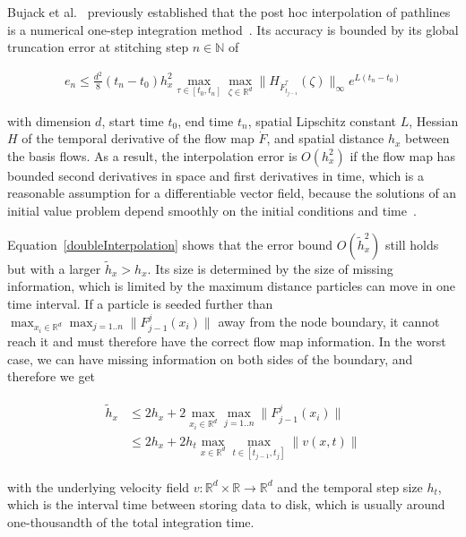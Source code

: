 %
Bujack et al.~\cite{bujack2015lagrangian} previously established that the post hoc interpolation 
of pathlines is a numerical one-step integration method~\cite{GH10}. 
%
Its accuracy is bounded by its global truncation error at stitching step $n\in\mathbb N$ of 
%
\begin{footnotesize}
\begin{equation}
\begin{aligned}\label{global}
e_{n}\leq\frac {d^2}8(t_n-t_0) h_x^2\max_{\tau\in[t_0,t_n]}\max_{\zeta\in\mathbb R^d}
\| H_{{\dot F}_{t_{j-1}}^{\tau}}(\zeta)\|_{\infty}e^{L(t_n-t_0)}
\end{aligned}
\end{equation}
\end{footnotesize}
%
with dimension $d$, start time $t_0$, end time $t_n$, spatial Lipschitz constant $L$, Hessian $H$ of the temporal derivative of the flow map $\dot F$, and spatial distance $h_x$ between the basis flows.
%
As a result, the interpolation error is $O(h_x^2)$ if the flow map has bounded second derivatives in space and first derivatives in time, which is a reasonable assumption for a differentiable vector field, because the solutions of an initial value problem depend smoothly on the initial conditions and time~\cite{hartman1973ordinary}.
%

Equation~\eqref{doubleInterpolation} shows that the error bound $O(\tilde h_x^2)$ still holds but with a larger $\tilde h_x>h_x$. 
%
Its size is determined by the size of missing information, which is limited by the maximum distance particles can move in one time interval.
%
If a particle is seeded further than $\max_{x_i\in\mathbb R^d} \max_{j=1..n} \| F_{j-1}^j(x_i)\|$ away from the node boundary, it cannot reach it and must therefore have the correct flow map information.
%
In the worst case, we can have missing information on both sides of the boundary, and therefore we get
%
\begin{footnotesize}
\begin{eqnarray}
\begin{aligned}\label{hx}
\tilde h_x&\leq 2h_x+2\max_{x_i\in\mathbb R^d} \max_{j=1..n} \| F_{j-1}^j(x_i)\|\\
&\leq 2h_x+2 h_t \max_{x\in\mathbb R^d} \max_{t\in[t_{j-1},t_j]}\| v(x,t)\|
\end{aligned}
\end{eqnarray}
\end{footnotesize}
%
with the underlying velocity field $v:\mathbb R^d \times \mathbb R \to \mathbb R^d$ and the temporal step size $h_t$, which is the interval time between storing data to disk, which is usually around one-thousandth of the total integration time.
%
%

